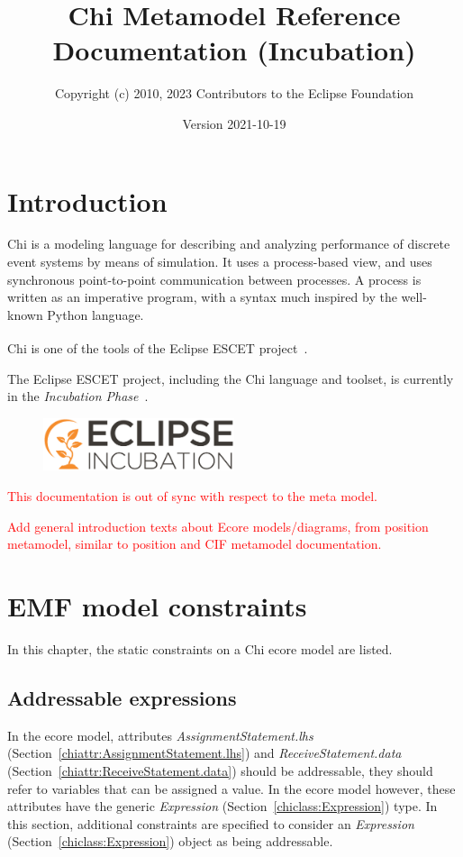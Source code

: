 \documentclass{report}
\title{Chi Metamodel Reference Documentation (Incubation)}
\author{Copyright (c) 2010, 2023 Contributors to the Eclipse Foundation}
\date{Version 2021-10-19}
\newcommand{\chiclass}[1]{\textit{#1} (Section~\ref{chiclass:#1})}
\newcommand{\chiattr}[1]{\textit{#1} (Section~\ref{chiattr:#1})}
\newcommand{\todo}[1]{\textcolor{red}{#1}}
\begin{document}
\maketitle
\tableofcontents

\chapter{Introduction}

Chi is a modeling language for describing and analyzing performance of
discrete event systems by means of simulation.
It uses a process-based view, and uses synchronous point-to-point
communication between processes. A process is written as an imperative
program, with a syntax much inspired by the well-known Python language.

Chi is one of the tools of the Eclipse ESCET\textsuperscript{\texttrademark{}}
project~\cite{Eclipse:ESCET}.

The Eclipse ESCET project, including the Chi language and toolset, is
currently in the \emph{Incubation Phase}~\cite{Eclipse:Incubation}.
\begin{figure}[H]
  \centering
  \includegraphics[width=0.5\textwidth]{figures/eclipse-incubation.png}
\end{figure}

\todo{This documentation is out of sync with respect to the meta model.}

\todo{Add general introduction texts about Ecore models/diagrams, from
position metamodel, similar to position and CIF metamodel documentation.}


\chapter{EMF model constraints}
In this chapter, the static constraints on a Chi ecore model are listed.

\section{Addressable expressions}\label{sect:addressable-expressions}
In the ecore model, attributes \chiattr{AssignmentStatement.lhs} and
\chiattr{ReceiveStatement.data} should be addressable, they should refer to
variables that can be assigned a value.
In the ecore model however, these attributes have the generic
\chiclass{Expression} type. In this section, additional constraints are
specified to consider an \chiclass{Expression} object as being addressable.
\end{document}
